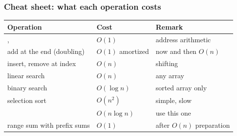 \documentclass[aspectratio=169,10pt,compress]{beamer}
\begin{document}
\begin{frame}[t,fragile] \frametitle{Cheat sheet: what each operation costs}


\begin{table}
		\small
		\begin{tabular}{@{}L{0.38\textwidth}L{0.22\textwidth}L{0.30\textwidth}@{}}
			\toprule
			\textbf{Operation} & \textbf{Cost} & \textbf{Remark} \\
			\midrule
			,       & $O(1)$          & address arithmetic \\
			add at the end (doubling)           & $O(1)$ amortized & now and then $O(n)$ \\
			insert, remove at index             & $O(n)$          & shifting \\
			linear search                       & $O(n)$          & any array \\
			binary search                       & $O(\log n)$     & sorted array only \\
			selection sort                      & $O(n^{2})$      & simple, slow \\
			                 & $O(n \log n)$   & use this one \\
			range sum with prefix sums          & $O(1)$          & after $O(n)$ preparation \\
			\bottomrule
		\end{tabular}
\end{table}%


\end{frame}
\end{document}
